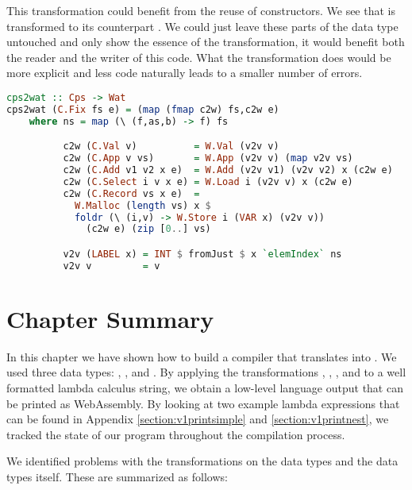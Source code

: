 {This transformation could benefit from the reuse of constructors. We see that  is transformed to its  counterpart . We could just leave these parts of the data type untouched and only show the essence of the transformation, it would benefit both the reader and the writer of this code. What the transformation does would be more explicit and less code naturally leads to a smaller number of errors.

\begin{lstlisting}[language=Haskell]
cps2wat :: Cps -> Wat
cps2wat (C.Fix fs e) = (map (fmap c2w) fs,c2w e)
    where ns = map (\ (f,as,b) -> f) fs

          c2w (C.Val v)          = W.Val (v2v v)
          c2w (C.App v vs)       = W.App (v2v v) (map v2v vs)
          c2w (C.Add v1 v2 x e)  = W.Add (v2v v1) (v2v v2) x (c2w e)
          c2w (C.Select i v x e) = W.Load i (v2v v) x (c2w e)
          c2w (C.Record vs x e)  =
            W.Malloc (length vs) x $
            foldr (\ (i,v) -> W.Store i (VAR x) (v2v v))
              (c2w e) (zip [0..] vs)

          v2v (LABEL x) = INT $ fromJust $ x `elemIndex` ns
          v2v v         = v
\end{lstlisting}

\section{\label{section:summarycps}Chapter Summary}
In this chapter we have shown how to build a compiler that translates  into . We used three data types: , , and . By applying the transformations , , , and  to a well formatted lambda calculus string, we obtain a low-level language output that can be printed as WebAssembly. By looking at two example lambda expressions that can be found in Appendix \ref{section:v1printsimple} and \ref{section:v1printnest}, we tracked the state of our program throughout the compilation process.

We identified problems with the transformations on the data types and the data types itself. These are summarized as follows:

}
